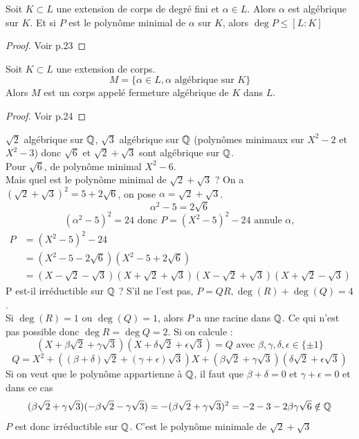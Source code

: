 \documentclass[]{report}
\begin{document}
    \begin{prop}{}{}
        Soit $K\subset L$ une extension de corps de degré fini et $\alpha\in L$. Alors $\alpha$ est algébrique sur $K$. Et si $P$ est le polynôme minimal de $\alpha$ sur $K$, alors $\deg P\le[L:K]$
    \end{prop}

    \begin{proof}
        Voir p.23
    \end{proof}

    \begin{tm}{}{}
        Soit $K\subset L$ une extension de corps.
        \[M=\{\alpha\in L,\alpha\text{ algébrique sur }K\}\]
        Alors $M$ est un corps appelé fermeture algébrique de $K$ dans $L$.
    \end{tm}

    \begin{proof}
        Voir p.24
    \end{proof}

    \begin{ex}{}{}
        $\sqrt2$ algébrique sur $\mathbb{Q}$, $\sqrt3$ algébrique sur $\mathbb{Q}$ (polynômes minimaux sur $X^2-2$ et $X^2-3$) donc $\sqrt6$ et $\sqrt2+\sqrt3$ sont algébrique sur $\mathbb{Q}$.\\
        Pour $\sqrt6$, de polynôme minimal $X^2-6$.\\
        Mais quel est le polynôme minimal de $\sqrt2+\sqrt3$ ? On a $(\sqrt2+\sqrt3)^2=5+2\sqrt6$, on pose $\alpha=\sqrt2+\sqrt3$.\\
        $$\alpha^2-5=2\sqrt6$$
        $$(\alpha^2-5)^2=24\text{ donc }P=(X^2-5)^2-24\text{ annule }\alpha,$$
        \begin{align*}
            P & = (X^2-5)^2-24\\
            & =(X^2-5-2\sqrt6)(X^2-5+2\sqrt6)\\
            & =(X-\sqrt2-\sqrt3)(X+\sqrt2+\sqrt3)(X-\sqrt2+\sqrt3)(X+\sqrt2-\sqrt3)
        \end{align*} P est-il irréductible sur $\mathbb{Q}$ ? S'il ne l'est pas, $P=QR,\deg(R)+\deg(Q)=4$. \\
        Si $\deg(R)=1$ ou $\deg(Q)=1$, alors $P$ a une racine dans $\mathbb{Q}$. Ce qui n'est pas possible donc $\deg R=\deg Q=2$. Si on calcule :
        $$(X+\beta\sqrt2+\gamma\sqrt3)(X+\delta\sqrt2+\epsilon\sqrt3)=Q\text{ avec }\beta,\gamma,\delta,\epsilon\in\{\pm1\}$$
        $$Q=X^2+((\beta+\delta)\sqrt2+(\gamma+\epsilon)\sqrt3)X+(\beta\sqrt2+\gamma\sqrt3)(\delta\sqrt2+\epsilon\sqrt3)$$
        Si on veut que le polynôme appartienne à $\mathbb{Q}$, il faut que $\beta+\delta=0$ et $\gamma+\epsilon=0$ et dans ce cas
        $$(\beta\sqrt2+\gamma\sqrt3)(-\beta\sqrt2-\gamma\sqrt3)=-(\beta\sqrt2+\gamma\sqrt3)^2=-2-3-2\beta\gamma\sqrt6\notin\mathbb{Q}$$
        $P$ est donc irréductible sur $\mathbb{Q}$. C'est le polynôme minimale de $\sqrt2+\sqrt3$
    \end{ex}
\end{document}

